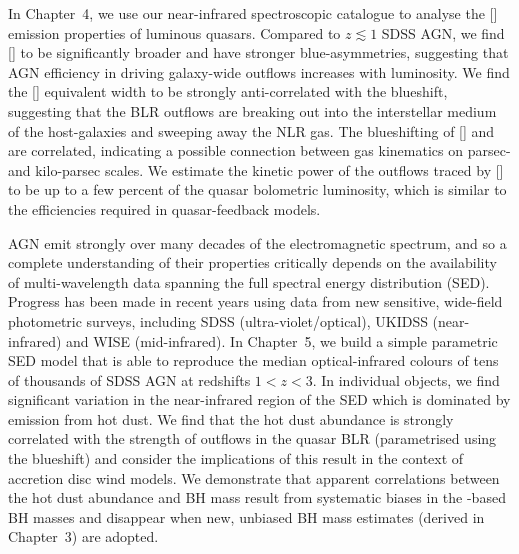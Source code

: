 In Chapter~4, we use our near-infrared spectroscopic catalogue to analyse the [] emission properties of luminous quasars. 
Compared to $z \lesssim 1$ SDSS AGN, we find [] to be significantly broader and have stronger blue-asymmetries, suggesting that AGN efficiency in driving galaxy-wide outflows increases with luminosity. 
We find the [] equivalent width to be strongly anti-correlated with the  blueshift, suggesting that the BLR outflows are breaking out into the interstellar medium of the host-galaxies and sweeping away the NLR gas. 
The blueshifting of [] and  are correlated, indicating a possible connection between gas kinematics on parsec- and kilo-parsec scales. 
We estimate the kinetic power of the outflows traced by [] to be up to a few percent of the quasar bolometric luminosity, which is similar to the efficiencies required in quasar-feedback models. 

AGN emit strongly over many decades of the electromagnetic spectrum, and so a complete understanding of their properties critically depends on the availability of multi-wavelength data spanning the full spectral energy distribution (SED). 
Progress has been made in recent years using data from new sensitive, wide-field photometric surveys, including SDSS (ultra-violet/optical), UKIDSS (near-infrared) and WISE (mid-infrared). 
In Chapter~5, we build a simple parametric SED model that is able to reproduce the median optical-infrared colours of tens of thousands of SDSS AGN at redshifts $1 < z < 3$. 
In individual objects, we find significant variation in the near-infrared region of the SED which is dominated by emission from hot dust.   
We find that the hot dust abundance is strongly correlated with the strength of outflows in the quasar BLR (parametrised using the  blueshift) and consider the implications of this result in the context of accretion disc wind models.
We demonstrate that apparent correlations between the hot dust abundance and BH mass result from systematic biases in the -based BH masses and disappear when new, unbiased BH mass estimates (derived in Chapter~3) are adopted. 

\vfill

\endgroup			

\vfill